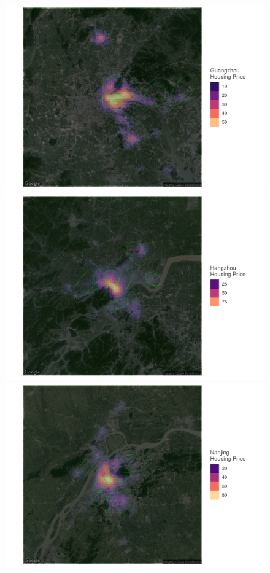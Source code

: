 \begin{figure}[h!]
    \begin{minipage}{0.328\textwidth}
        \includegraphics[width=\linewidth]{../figures/distribution_of_hp_and_broker/Guangzhou.pdf}
    \end{minipage}
    \hfill
    \begin{minipage}{0.328\textwidth}
        \includegraphics[width=\linewidth]{../figures/distribution_of_hp_and_broker/Hangzhou.pdf}
    \end{minipage}
    \begin{minipage}{0.328\textwidth}
        \includegraphics[width=\linewidth]{../figures/distribution_of_hp_and_broker/Nanjing.pdf}

\end{minipage}
\end{figure}
